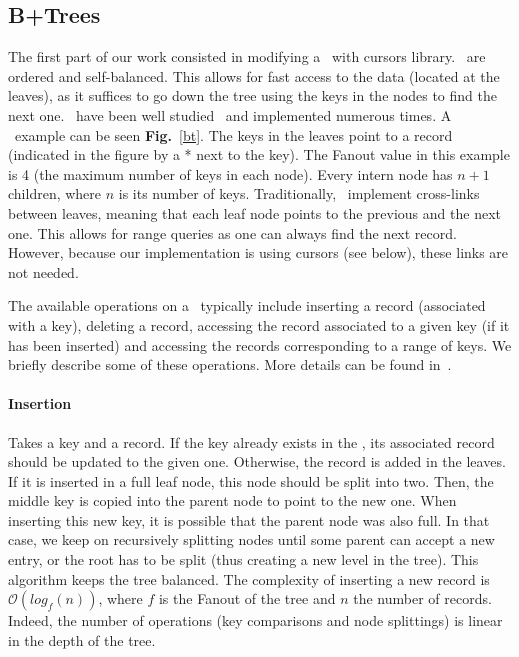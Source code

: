 %
\subsection{B+Trees}
The first part of our work consisted in modifying a \btrees\ with cursors library.
\btrees\ are ordered and self-balanced.
This allows for fast access to the data (located at the leaves), as it suffices to go down the tree using the keys in the nodes to find the next one.
\btrees\ have been well studied~\cite{dbms} and implemented numerous times. %
A \btree\ example can be seen \textbf{Fig.}~\ref{bt}.
The keys in the leaves point to a record (indicated in the figure by a * next to the key).
The Fanout value in this example is 4 (the maximum number of keys in each node).
Every intern node has $n+1$ children, where $n$ is its number of keys.
Traditionally, \btrees\ implement cross-links between leaves, meaning that each leaf node points to the previous and the next one.
This allows for range queries as one can always find the next record.
However, because our implementation is using cursors (see below), these links are not needed.

The available operations on a \btree\ typically include inserting a record (associated with a key), deleting a record, accessing the record associated to a given key (if it has been inserted) and accessing the records corresponding to a range of keys.
We briefly describe some of these operations. More details can be found in~\cite{dbms}.
\paragraph{Insertion} Takes a key and a record.
If the key already exists in the \btree, its associated record should be updated to the given one. Otherwise, the record is added in the leaves.
If it is inserted in a full leaf node, this node should be split into two. Then, the middle key is copied into the parent node to point to the new one.
When inserting this new key, it is possible that the parent node was also full.
In that case, we keep on recursively splitting nodes until some parent can accept a new entry, or the root has to be split (thus creating a new level in the tree).
This algorithm keeps the tree balanced.
The complexity of inserting a new record is $\mathcal{O}(log_{f}(n))$, where $f$ is the Fanout of the tree and $n$ the number of records.
Indeed, the number of operations (key comparisons and node splittings) is linear in the depth of the tree.

